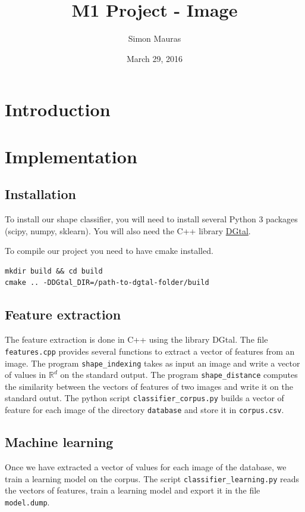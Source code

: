 \documentclass[a4paper, 11pt]{article}
\title{M1 Project - Image}
\author{Simon Mauras}
\date{March 29,  2016}
\begin{document}
\maketitle

\tableofcontents

\newpage
\section{Introduction}

\section{Implementation}

\subsection{Installation}
To install our shape classifier, you will need to install several Python 3 packages (scipy, numpy, sklearn). You will also need the C++ library \href{http://dgtal.org}{DGtal}.

\medskip\noindent To compile our project you need to have cmake installed.
\begin{verbatim}
mkdir build && cd build
cmake .. -DDGtal_DIR=/path-to-dgtal-folder/build
\end{verbatim}

\subsection{Feature extraction}

The feature extraction is done in C++ using the library DGtal. The file \verb|features.cpp| provides several functions to extract a vector of features from an image. 
The program \verb|shape_indexing| takes as input an image and write a vector of values in $\mathbb R^d$ on the standard output.
The program \verb|shape_distance| computes the similarity between the vectors of features of two images and write it on the standard outut.
The python script \verb|classifier_corpus.py| builds a vector of feature for each image of the directory \verb|database| and store it in \verb|corpus.csv|.

\subsection{Machine learning}

Once we have extracted a vector of values for each image of the database, we train a learning model on the corpus. The script \verb|classifier_learning.py| reads the vectors of features, train a learning model and export it in the file \verb|model.dump|.
\end{document}
